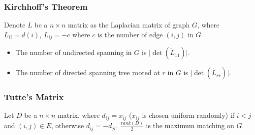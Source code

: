 
\subsubsection{Kirchhoff's Theorem}
Denote $L$ be a $n \times n$ matrix as the Laplacian matrix of graph $G$, where $L_{ii} = d(i)$, $L_{ij} = -c$ where $c$ is the number of edge $(i, j)$ in $G$.
\begin{itemize}
    \item The number of undirected spanning in $G$ is $\lvert \det(\tilde{L}_{11}) \rvert$.
    \item The number of directed spanning tree rooted at $r$ in $G$ is $\lvert \det(\tilde{L}_{rr}) \rvert$.
\end{itemize}

\subsubsection{Tutte's Matrix}
Let $D$ be a $n \times n$ matrix, where $d_{ij} = x_{ij}$ ($x_{ij}$ is chosen uniform randomly) if $i < j$ and $(i, j) \in E$, otherwise $d_{ij} = -d_{ji}$. $\frac{rank(D)}{2}$ is the maximum matching on $G$.
